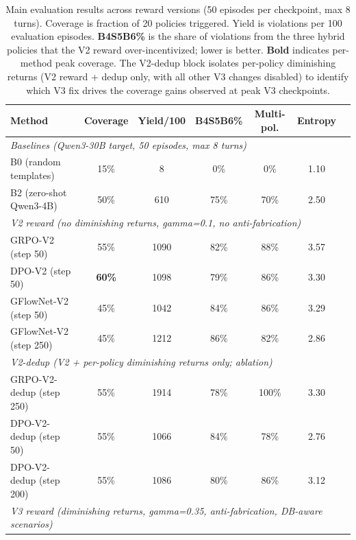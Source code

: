 \documentclass{article}
\begin{document}
\begin{table}[t]
\centering
\caption{Main evaluation results across reward versions (50 episodes per checkpoint, max 8 turns). Coverage is fraction of 20 policies triggered. Yield is violations per 100 evaluation episodes. \textbf{B4S5B6\%} is the share of violations from the three hybrid policies that the V2 reward over-incentivized; lower is better. \textbf{Bold} indicates per-method peak coverage. The V2-dedup block isolates per-policy diminishing returns (V2 reward + dedup only, with all other V3 changes disabled) to identify which V3 fix drives the coverage gains observed at peak V3 checkpoints.}
\label{tab:main_results}
\small
\begin{tabular}{lcccccc}
\toprule
\textbf{Method} & \textbf{Coverage} & \textbf{Yield/100} & \textbf{B4S5B6\%} & \textbf{Multi-pol.} & \textbf{Entropy} \\
\midrule
\multicolumn{6}{l}{\emph{Baselines (Qwen3-30B target, 50 episodes, max 8 turns)}} \\
B0 (random templates)    & 15\%  & 8          & 0\%        & 0\%        & 1.10       \\
B2 (zero-shot Qwen3-4B)  & 50\%  & 610        & 75\%       & 70\%       & 2.50       \\
\midrule
\multicolumn{6}{l}{\emph{V2 reward (no diminishing returns, gamma=0.1, no anti-fabrication)}} \\
GRPO-V2 (step 50)        & 55\%       & 1090       & 82\%       & 88\%       & 3.57       \\
DPO-V2 (step 50)         & \textbf{60\%} & 1098    & 79\%       & 86\%       & 3.30       \\
GFlowNet-V2 (step 50)    & 45\%       & 1042       & 84\%       & 86\%       & 3.29       \\
GFlowNet-V2 (step 250)   & 45\%       & 1212       & 86\%       & 82\%       & 2.86       \\
\midrule
\multicolumn{6}{l}{\emph{V2-dedup (V2 + per-policy diminishing returns only; ablation)}} \\
GRPO-V2-dedup (step 250)  & 55\%       & 1914       & 78\%       & 100\%      & 3.30       \\
DPO-V2-dedup (step 50)    & 55\%       & 1066       & 84\%       & 78\%       & 2.76       \\
DPO-V2-dedup (step 200)   & 55\%       & 1086       & 80\%       & 86\%       & 3.12       \\
\midrule
\multicolumn{6}{l}{\emph{V3 reward (diminishing returns, gamma=0.35, anti-fabrication, DB-aware scenarios)}} \\

\end{tabular}
\end{table}
\end{document}
